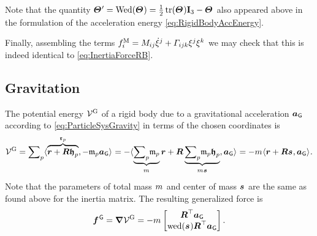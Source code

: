 Note that the quantity $\bodyMOIp{}{} = \wedMatOp(\bodyMOI{}{}) = \tfrac{1}{2} \tr(\bodyMOI{}{})\idMat[3] - \bodyMOI{}{}$ also appeared above in the formulation of the acceleration energy \eqref{eq:RigidBodyAccEnergy}.

Finally, assembling the terms $f^{\mathrm{M}}_{i} = M_{ij} \dot{\xi}^{j} + \varGamma_{ijk} \xi^{j}\xi^{k}$ we may check that this is indeed identical to \eqref{eq:InertiaForceRB}.


\subsection{Gravitation}
The potential energy $\mathcal{V}^{\mathrm{G}}$ of a rigid body due to a gravitational acceleration $\boldsymbol{a}_{\mathsf{G}}$ according to \eqref{eq:ParticleSysGravity} in terms of the chosen coordinates is
\begin{align}\label{eq:RBPotentialEnergyGravity}
 \potentialGravity 
 = \sumParticles \sProd{\overbrace{\r + \R \particleBodyPos{\PidxI}}^{\particlePos{\PidxI}}}{-\particleMass{\PidxI} \gravityAcc}
 = -\sProd{\underbrace{\sumParticles\! \particleMass{\PidxI}}_{\bodyMass{}{}} \r + \R \underbrace{\sumParticles\! \particleMass{\PidxI} \particleBodyPos{\PidxI}}_{\bodyMass{}{}\bodyCOM{}{}}}{\gravityAcc}
 = -\bodyMass{}{} \sProd{\r + \R \bodyCOM{}{}}{\gravityAcc}.
\end{align}
Note that the parameters of total mass $\bodyMass{}{}$ and center of mass $\bodyCOM{}{}$ are the same as found above for the inertia matrix.
The resulting generalized force is
\begin{align}
 \bodyGenForceGravity{}{} = \differential \potentialGravity = -\bodyMass{}{} \begin{bmatrix} \R^\top \gravityAcc \\ \wedOp(\bodyCOM{}{}) \R^\top \gravityAcc \end{bmatrix}.
\end{align}


